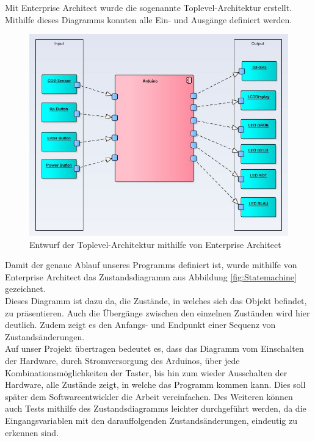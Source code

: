 \label{ArchitekturundVerhalten}

Mit Enterprise Architect wurde die sogenannte Toplevel-Architektur erstellt. Mithilfe dieses Diagramms konnten alle Ein- und Ausgänge definiert werden.

\begin{figure}[!hbt]
	\centering
	\includegraphics[width=0.7\linewidth]{Images/Topleveldiagramm}
	\caption{Entwurf der Toplevel-Architektur mithilfe von Enterprise Architect}
	\label{fig:Toplevel}
\end{figure}
\newpage
Damit der genaue Ablauf unseres Programms definiert ist, wurde mithilfe von Enterprise Architect das Zustandsdiagramm aus Abbildung \ref{fig:Statemachine} gezeichnet. \\
Dieses Diagramm ist dazu da, die Zustände, in welches sich das Objekt befindet, zu präsentieren. Auch die Übergänge zwischen den einzelnen Zuständen wird hier deutlich. Zudem zeigt es den Anfangs- und Endpunkt einer Sequenz von Zustandsänderungen. \cite[vgl. S. 120]{JosephSchmuller.2000} \\
Auf unser Projekt übertragen bedeutet es, dass das Diagramm vom Einschalten der Hardware, durch Stromversorgung des Arduinos, über jede Kombinationsmöglichkeiten der Taster, bis hin zum wieder Ausschalten der Hardware, alle Zustände zeigt, in welche das Programm kommen kann. Dies soll später dem Softwareentwickler die Arbeit vereinfachen. Des Weiteren können auch Tests mithilfe des Zustandsdiagramms leichter durchgeführt werden, da die Eingangsvariablen mit den darauffolgenden Zustandsänderungen, eindeutig zu erkennen sind. \\

